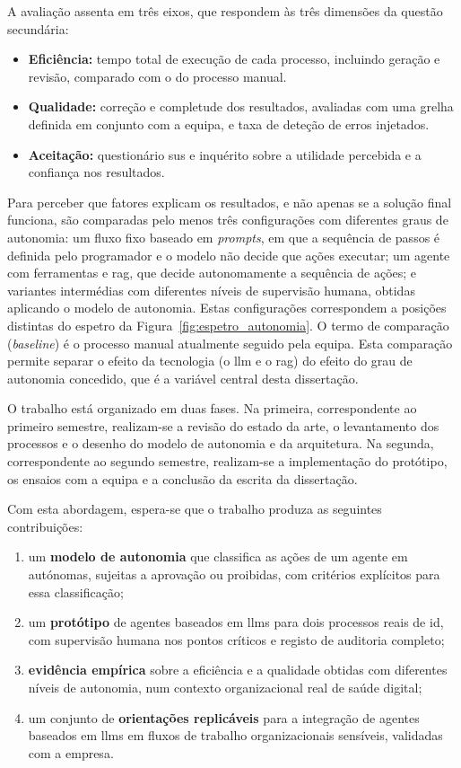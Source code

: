 A avaliação assenta em três eixos, que respondem às três dimensões da questão secundária:

\begin{itemize}
  \item \textbf{Eficiência:} tempo total de execução de cada processo, incluindo geração e revisão, comparado com o do processo manual.
  \item \textbf{Qualidade:} correção e completude dos resultados, avaliadas com uma grelha definida em conjunto com a equipa, e taxa de deteção de erros injetados.
  \item \textbf{Aceitação:} questionário \gls{sus} e inquérito sobre a utilidade percebida e a confiança nos resultados.
\end{itemize}

Para perceber que fatores explicam os resultados, e não apenas se a solução final funciona, são comparadas pelo menos três configurações com diferentes graus de autonomia: um fluxo fixo baseado em \textit{prompts}, em que a sequência de passos é definida pelo programador e o modelo não decide que ações executar; um agente com ferramentas e \gls{rag}, que decide autonomamente a sequência de ações; e variantes intermédias com diferentes níveis de supervisão humana, obtidas aplicando o modelo de autonomia. Estas configurações correspondem a posições distintas do espetro da Figura~\ref{fig:espetro_autonomia}. O termo de comparação (\textit{baseline}) é o processo manual atualmente seguido pela equipa. Esta comparação permite separar o efeito da tecnologia (o \gls{llm} e o \gls{rag}) do efeito do grau de autonomia concedido, que é a variável central desta dissertação.

O trabalho está organizado em duas fases. Na primeira, correspondente ao primeiro semestre, realizam-se a revisão do estado da arte, o levantamento dos processos e o desenho do modelo de autonomia e da arquitetura. Na segunda, correspondente ao segundo semestre, realizam-se a implementação do protótipo, os ensaios com a equipa e a conclusão da escrita da dissertação.

Com esta abordagem, espera-se que o trabalho produza as seguintes contribuições:

\begin{enumerate}
  \item um \textbf{modelo de autonomia} que classifica as ações de um agente em autónomas, sujeitas a aprovação ou proibidas, com critérios explícitos para essa classificação;
  \item um \textbf{protótipo} de agentes baseados em \glspl{llm} para dois processos reais de \gls{id}, com supervisão humana nos pontos críticos e registo de auditoria completo;
  \item \textbf{evidência empírica} sobre a eficiência e a qualidade obtidas com diferentes níveis de autonomia, num contexto organizacional real de saúde digital;
  \item um conjunto de \textbf{orientações replicáveis} para a integração de agentes baseados em \glspl{llm} em fluxos de trabalho organizacionais sensíveis, validadas com a empresa.
\end{enumerate}

